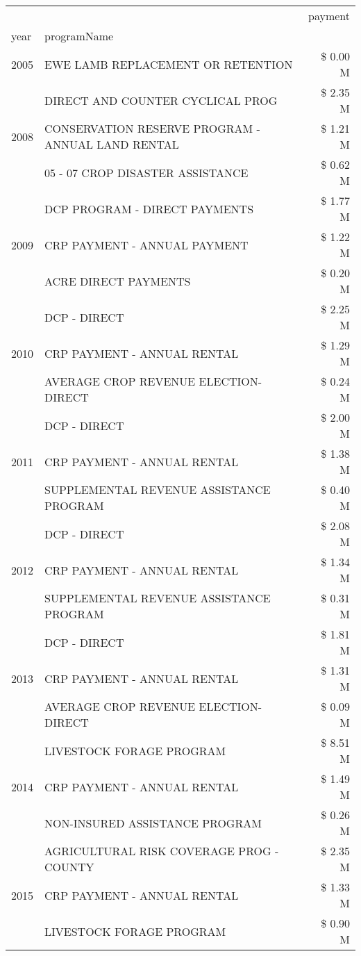 \begin{tabular}{llr}
\toprule
 &  & payment \\
year & programName &  \\
\midrule
2005 & EWE LAMB REPLACEMENT OR RETENTION & \$ 0.00 M \\
\cline{1-3}
\multirow[t]{3}{*}{2008} & DIRECT AND COUNTER CYCLICAL PROG & \$ 2.35 M \\
 & CONSERVATION RESERVE PROGRAM - ANNUAL LAND RENTAL & \$ 1.21 M \\
 & 05 - 07 CROP DISASTER ASSISTANCE & \$ 0.62 M \\
\cline{1-3}
\multirow[t]{3}{*}{2009} & DCP PROGRAM - DIRECT PAYMENTS & \$ 1.77 M \\
 & CRP PAYMENT - ANNUAL PAYMENT & \$ 1.22 M \\
 & ACRE DIRECT PAYMENTS & \$ 0.20 M \\
\cline{1-3}
\multirow[t]{3}{*}{2010} & DCP - DIRECT & \$ 2.25 M \\
 & CRP PAYMENT - ANNUAL RENTAL & \$ 1.29 M \\
 & AVERAGE CROP REVENUE ELECTION-DIRECT & \$ 0.24 M \\
\cline{1-3}
\multirow[t]{3}{*}{2011} & DCP - DIRECT & \$ 2.00 M \\
 & CRP PAYMENT - ANNUAL RENTAL & \$ 1.38 M \\
 & SUPPLEMENTAL REVENUE ASSISTANCE PROGRAM & \$ 0.40 M \\
\cline{1-3}
\multirow[t]{3}{*}{2012} & DCP - DIRECT & \$ 2.08 M \\
 & CRP PAYMENT - ANNUAL RENTAL & \$ 1.34 M \\
 & SUPPLEMENTAL REVENUE ASSISTANCE PROGRAM & \$ 0.31 M \\
\cline{1-3}
\multirow[t]{3}{*}{2013} & DCP - DIRECT & \$ 1.81 M \\
 & CRP PAYMENT - ANNUAL RENTAL & \$ 1.31 M \\
 & AVERAGE CROP REVENUE ELECTION-DIRECT & \$ 0.09 M \\
\cline{1-3}
\multirow[t]{3}{*}{2014} & LIVESTOCK FORAGE PROGRAM & \$ 8.51 M \\
 & CRP PAYMENT - ANNUAL RENTAL & \$ 1.49 M \\
 & NON-INSURED ASSISTANCE PROGRAM & \$ 0.26 M \\
\cline{1-3}
\multirow[t]{3}{*}{2015} & AGRICULTURAL RISK COVERAGE PROG - COUNTY & \$ 2.35 M \\
 & CRP PAYMENT - ANNUAL RENTAL & \$ 1.33 M \\
 & LIVESTOCK FORAGE PROGRAM & \$ 0.90 M \\

\end{tabular}
